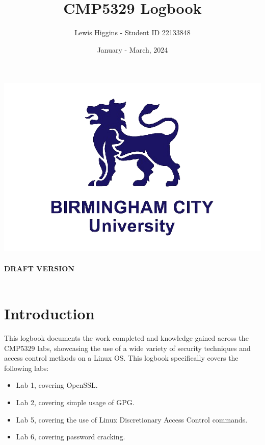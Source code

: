 \documentclass[12pt]{report}
\title{CMP5329 Logbook}
\author{Lewis Higgins - Student ID 22133848}
\date{January - March, 2024}
\begin{document}
    \pagecolor{yellow}

    \makeatletter
    \begin{titlepage}
        \begin{center}
            \includegraphics[width=0.7\linewidth]{bcu logo}\\[4ex]
            {\huge \bfseries  \@title }\\[2ex]
            {\huge \bfseries  DRAFT VERSION }\\[2ex]
            {\@author}\\[50ex]
            {\large \@date}
        \end{center}
    \end{titlepage}
    \makeatother
    \thispagestyle{empty}
    \newpage

    \pagecolor{white}

    \tableofcontents

    \chapter*{Introduction}\label{ch:introduction}

    This logbook documents the work completed and knowledge gained across the CMP5329 labs, showcasing
    the use of a wide variety of security techniques and access control methods on a Linux OS\@.
    This logbook specifically covers the following labs:
    \begin{itemize}
        \item Lab 1, covering OpenSSL\@.
        \item Lab 2, covering simple usage of GPG\@.
        \item Lab 5, covering the use of Linux Discretionary Access Control commands.
        \item Lab 6, covering password cracking.
    \end{itemize}
\end{document}
